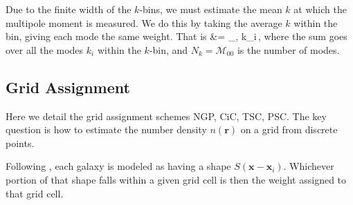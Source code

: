 \documentclass[aps,prd,reprint,floatfix,superscriptaddress,showkeys,nofootinbib]{revtex4-1}
\def\ba#1\ea{\begin{align}#1\end{align}}
\def\vr{{\bm{r}}}
\def\vx{{\bm{x}}}
\begin{document}
Due to the finite width of the $k$-bins, we must estimate the mean $k$ at which
the multipole moment is measured. We do this by taking the average $k$ within
the bin, giving each mode the same weight. That is
\ba
k &=  \sum_{\mu,\phi} k_i\,,
\ea
where the sum goes over all the modes $k_i$ within the $k$-bin, and
$N_k=\mathcal{M}_{00}$ is the number of modes.


\subsection{Grid Assignment}
\label{sec:grid_assignment}
Here we detail the grid assignment schemes NGP, CiC, TSC, PSC. The key question
is how to estimate the number density $n(\vr)$ on a grid from discrete points.

Following \citet{Hockney+,Jing:2005ApJ...620..559J}, each galaxy is modeled as
having a shape $S(\vx - \vx_i)$. Whichever portion of that shape falls within a
given grid cell is then the weight assigned to that grid cell.
\end{document}
